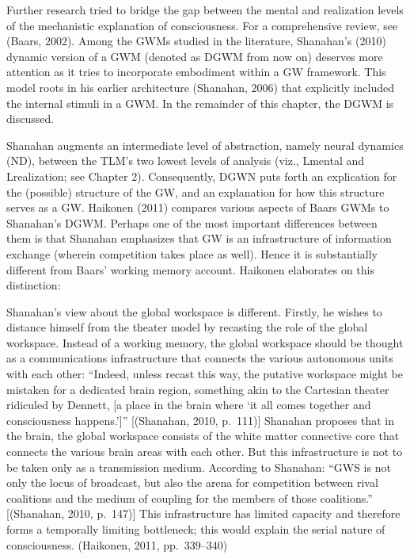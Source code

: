 \documentclass[12pt,twoside]{reedthesis}
\begin{document}
Further research tried to bridge the gap between the mental and realization levels of the mechanistic explanation of consciousness. For a comprehensive review, see (Baars, 2002). Among the GWMs studied in the literature, Shanahan's (2010) dynamic version of a GWM (denoted as DGWM from now on) deserves more attention as it tries to incorporate embodiment within a GW framework. This model roots in his earlier architecture (Shanahan, 2006) that explicitly included the internal stimuli in a GWM. In the remainder of this chapter, the DGWM is discussed.

Shanahan augments an intermediate level of abstraction, namely neural dynamics (ND), between the TLM's two lowest levels of analysis (viz., Lmental and Lrealization; see Chapter 2). Consequently, DGWN puts forth an explication for the (possible) structure of the GW, and an explanation for how this structure serves as a GW. Haikonen (2011) compares various aspects of Baars GWMs to Shanahan's DGWM. Perhaps one of the most important differences between them is that Shanahan emphasizes that GW is an infrastructure of information exchange (wherein competition takes place as well). Hence it is substantially different from Baars' working memory account. Haikonen elaborates on this distinction:

Shanahan's view about the global workspace is different. Firstly, he wishes to distance himself from the theater model by recasting the role of the global workspace. Instead of a working memory, the global workspace should be thought as a communications infrastructure that connects the various autonomous units with each other: ``Indeed, unless recast this way, the putative workspace might be mistaken for a dedicated brain region, something akin to the Cartesian theater ridiculed by Dennett, {[}a place in the brain where `it all comes together and consciousness happens.'{]}'' {[}(Shanahan, 2010, p.~111){]} Shanahan proposes that in the brain, the global workspace consists of the white matter connective core that connects the various brain areas with each other. But this infrastructure is not to be taken only as a transmission medium. According to Shanahan: ``GWS is not only the locus of broadcast, but also the arena for competition between rival coalitions and the medium of coupling for the members of those coalitions.'' {[}(Shanahan, 2010, p.~147){]} This infrastructure has limited capacity and therefore forms a temporally limiting bottleneck; this would explain the serial nature of consciousness. (Haikonen, 2011, pp.~339--340)
\end{document}

